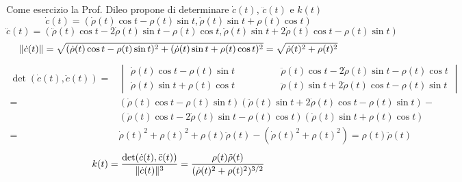 \begin{esempio}
\begin{center}
\begin{tikzpicture}[scale=0.6]
        \end{tikzpicture}
        \end{center}
        Come esercizio la Prof. Dileo propone di determinare $\dot{c}(t)$, $\ddot{c}(t)$ e $k(t)$
        \[ \dot{c}(t) = (\dot{\rho}(t) \cos t - \rho(t) \sin t, \dot{\rho}(t) \sin t + \rho(t) \cos t)   \]
        \[ \ddot{c}(t) = (\ddot{\rho}(t) \cos t - 2 \dot{\rho}(t) \sin t - \rho(t) \cos t, \ddot{\rho}(t) \sin t + 2 \dot{\rho}(t) \cos t - \rho(t) \sin t)   \]
        \[ \lVert\dot{c}(t)\rVert = \sqrt{(\dot{\rho}(t) \cos t - \rho(t) \sin t)^2 + (\dot{\rho}(t) \sin t + \rho(t) \cos t)^2} = \sqrt{\dot{\rho}(t)^2 + \rho(t)^2} \]
        \begin{align*} \det(\dot{c}(t), \ddot{c}(t)) =& \begin{vmatrix}
            \dot{\rho}(t) \cos t - \rho(t) \sin t \qquad & \qquad \ddot{\rho}(t) \cos t - 2 \dot{\rho}(t) \sin t - \rho(t) \cos t \\
            \dot{\rho}(t) \sin t + \rho(t) \cos t \qquad & \qquad \ddot{\rho}(t) \sin t + 2 \dot{\rho}(t) \cos t - \rho(t) \sin t
        \end{vmatrix}\\
         =& (\dot{\rho}(t) \cos t - \rho(t) \sin t)(\ddot{\rho}(t) \sin t + 2 \dot{\rho}(t) \cos t - \rho(t) \sin t) - \\ 
         &(\ddot{\rho}(t) \cos t - 2 \dot{\rho}(t) \sin t - \rho(t) \cos t)(\dot{\rho}(t) \sin t + \rho(t) \cos t) \\
         =& \dot{\rho}(t)^2 + \rho(t)^2 + \rho(t) \ddot{\rho}(t) - (\dot{\rho}(t)^2 + \rho(t)^2) = \rho(t) \ddot{\rho}(t) 
        \end{align*}
        \[ k(t) = \frac{\det(\dot{c}(t), \ddot{c}(t))}{\lVert\dot{c}(t)\rVert^3}= \frac{\rho(t) \ddot{\rho}(t)}{(\dot{\rho}(t)^2 + \rho(t)^2)^{3/2}} \]
        \end{esempio}
        \newpage
